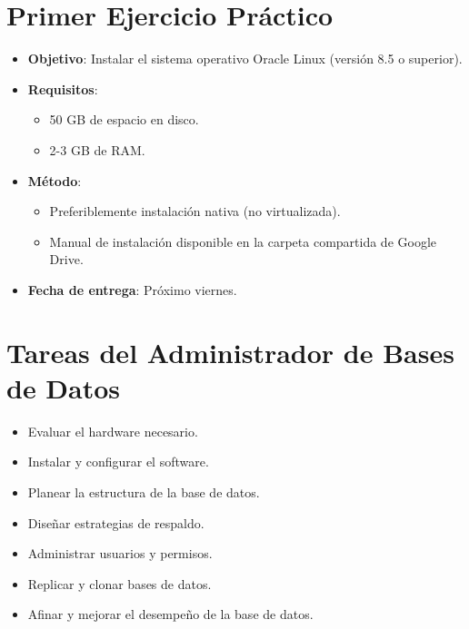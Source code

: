 \documentclass{article}
\begin{document}
\section{Primer Ejercicio Práctico}
\begin{itemize}
    \item \textbf{Objetivo}: Instalar el sistema operativo Oracle Linux (versión 8.5 o superior).
    \item \textbf{Requisitos}:
    \begin{itemize}
        \item 50 GB de espacio en disco.
        \item 2-3 GB de RAM.
    \end{itemize}
    \item \textbf{Método}:
    \begin{itemize}
        \item Preferiblemente instalación nativa (no virtualizada).
        \item Manual de instalación disponible en la carpeta compartida de Google Drive.
    \end{itemize}
    \item \textbf{Fecha de entrega}: Próximo viernes.
\end{itemize}

\section{Tareas del Administrador de Bases de Datos}
\begin{itemize}
    \item Evaluar el hardware necesario.
    \item Instalar y configurar el software.
    \item Planear la estructura de la base de datos.
    \item Diseñar estrategias de respaldo.
    \item Administrar usuarios y permisos.
    \item Replicar y clonar bases de datos.
    \item Afinar y mejorar el desempeño de la base de datos.
\end{itemize}
\end{document}
